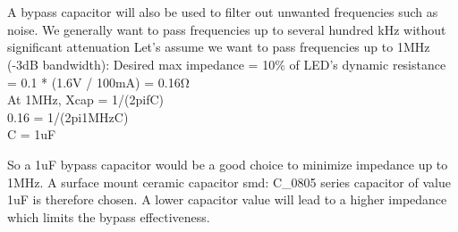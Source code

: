 \documentclass[class=report,11pt,crop=false]{standalone}
\begin{document}
\\\\
A bypass capacitor will also be used to filter out unwanted frequencies such as noise. We generally want to pass frequencies up to several hundred kHz without significant attenuation
Let's assume we want to pass frequencies up to 1MHz (-3dB bandwidth):
Desired max impedance = 10\% of LED's dynamic resistance \\
= 0.1 * (1.6V / 100mA) = 0.16Ω \\
At 1MHz, Xcap = 1/(2pifC) \\
0.16 = 1/(2pi1MHzC) \\
C = 1uF

So a 1uF bypass capacitor would be a good choice to minimize impedance up to 1MHz. A surface mount ceramic capacitor smd: C\_0805 series capacitor of value 1uF is therefore chosen. A lower capacitor value will lead to a higher impedance which limits the bypass effectiveness.
\end{document}
